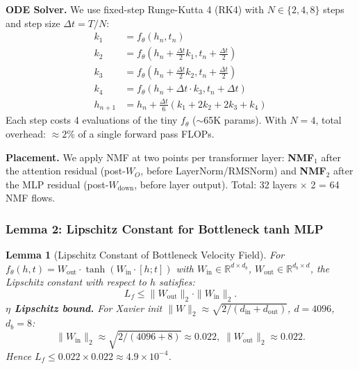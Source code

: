 \documentclass[conference]{IEEEtran}
\newtheorem{lemma}[theorem]{Lemma}
\newcommand{\RR}{\mathbb{R}}
\begin{document}
\textbf{ODE Solver.} We use fixed-step Runge-Kutta 4 (RK4) with $N \in \{2, 4, 8\}$ steps and step size $\Delta t = T/N$:
\begin{align}
k_1 &= f_\theta(h_n, t_n) \nonumber\\
k_2 &= f_\theta(h_n + \tfrac{\Delta t}{2}k_1, t_n + \tfrac{\Delta t}{2}) \nonumber\\
k_3 &= f_\theta(h_n + \tfrac{\Delta t}{2}k_2, t_n + \tfrac{\Delta t}{2}) \nonumber\\
k_4 &= f_\theta(h_n + \Delta t \cdot k_3, t_n + \Delta t) \nonumber\\
h_{n+1} &= h_n + \frac{\Delta t}{6}(k_1 + 2k_2 + 2k_3 + k_4)
\end{align}
Each step costs 4 evaluations of the tiny $f_\theta$ ($\sim$65K params). With $N=4$, total overhead: $\approx 2\%$ of a single forward pass FLOPs.

\textbf{Placement.} We apply NMF at two points per transformer layer: \textbf{NMF}$_1$ after the attention residual (post-$W_O$, before LayerNorm/RMSNorm) and \textbf{NMF}$_2$ after the MLP residual (post-$W_{\text{down}}$, before layer output). Total: 32 layers $\times$ 2 = 64 NMF flows.

\subsubsection{Lemma 2: Lipschitz Constant for Bottleneck tanh MLP}

\begin{lemma}[Lipschitz Constant of Bottleneck Velocity Field]
\label{lem:lipschitz-nmf}
For $f_\theta(h, t) = W_{\text{out}} \cdot \tanh(W_{\text{in}} \cdot [h;t])$ with $W_{\text{in}} \in \RR^{d \times d_b}$, $W_{\text{out}} \in \RR^{d_b \times d}$, the Lipschitz constant with respect to $h$ satisfies:
\begin{equation}
L_f \leq \|W_{\text{out}}\|_2 \cdot \|W_{\text{in}}\|_2.
\end{equation}
\textbf{$\eta$ Lipschitz bound.} For Xavier init $\|W\|_2 \approx \sqrt{2/(d_{\text{in}}{+}d_{\text{out}})}$, $d{=}4096$, $d_b{=}8$:
\begin{equation}
\|W_{\text{in}}\|_2 \approx \sqrt{2/(4096{+}8)} \approx 0.022,\; \|W_{\text{out}}\|_2 \approx 0.022.
\end{equation}
Hence $L_f \leq 0.022 \times 0.022 \approx 4.9 \times 10^{-4}$.
\end{lemma}
\end{document}
